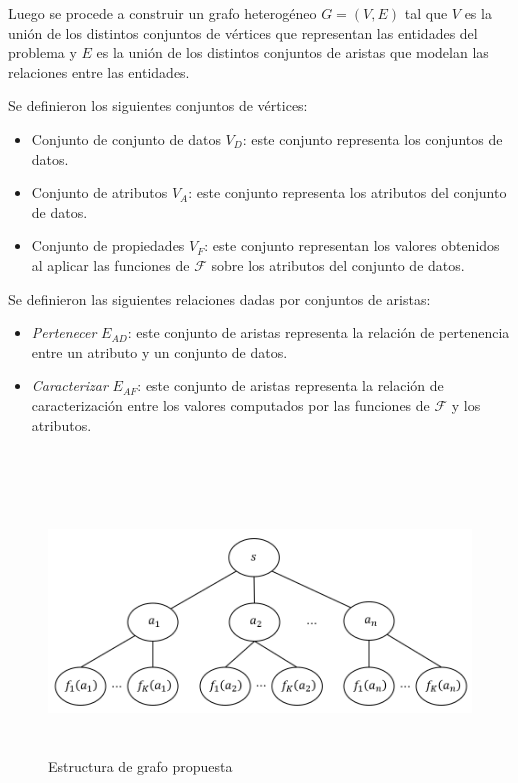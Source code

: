 Luego se procede a construir un grafo heterog\'eneo $G = (V,E)$ tal que $V$ es la uni\'on
de los distintos conjuntos de v\'ertices que representan las entidades del problema y $E$ es la uni\'on de los distintos
conjuntos de aristas que modelan las relaciones entre las entidades.

Se definieron los siguientes conjuntos de v\'ertices:
\begin{itemize}
    \item Conjunto de conjunto de datos $V_D$: este conjunto representa los conjuntos de datos.
    \item Conjunto de atributos $V_A$: este conjunto representa los atributos del conjunto de datos.
    \item Conjunto de propiedades $V_F$: este conjunto representan los valores obtenidos al aplicar las funciones de $\mathcal{F}$ sobre los atributos del conjunto de datos. 
\end{itemize}

Se definieron las siguientes relaciones dadas por conjuntos de aristas:
\begin{itemize}
    \item \textit{Pertenecer} $E_{AD}$: este conjunto de aristas representa la relaci\'on de pertenencia entre un atributo y un conjunto de datos.
    \item \textit{Caracterizar} $E_{AF}$: este conjunto de aristas representa la relaci\'on de caracterizaci\'on entre los valores computados por las funciones de $\mathcal{F}$ y los atributos.\\\\\\
\end{itemize} 

\begin{center}
    \begin{figure}[h!]
        \centering
        \includegraphics[width=130mm, height=70mm]{Graphics/new_graph.png}
        \caption{Estructura de grafo propuesta}
        \label{fig: graph-struct}
    \end{figure}
\end{center}



